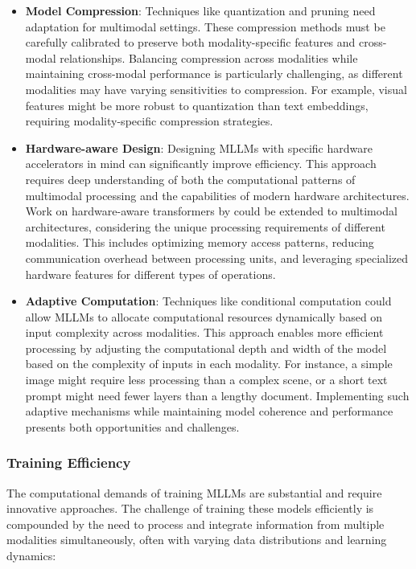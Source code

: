 \begin{itemize}
    \item \textbf{Model Compression}: Techniques like quantization and pruning \citep{ganesh2021compressing} need adaptation for multimodal settings. These compression methods must be carefully calibrated to preserve both modality-specific features and cross-modal relationships. Balancing compression across modalities while maintaining cross-modal performance is particularly challenging, as different modalities may have varying sensitivities to compression. For example, visual features might be more robust to quantization than text embeddings, requiring modality-specific compression strategies.
    
    \item \textbf{Hardware-aware Design}: Designing MLLMs with specific hardware accelerators in mind can significantly improve efficiency. This approach requires deep understanding of both the computational patterns of multimodal processing and the capabilities of modern hardware architectures. Work on hardware-aware transformers by could be extended to multimodal architectures, considering the unique processing requirements of different modalities. This includes optimizing memory access patterns, reducing communication overhead between processing units, and leveraging specialized hardware features for different types of operations.
    
    \item \textbf{Adaptive Computation}: Techniques like conditional computation \citep{bengio2013estimating} could allow MLLMs to allocate computational resources dynamically based on input complexity across modalities. This approach enables more efficient processing by adjusting the computational depth and width of the model based on the complexity of inputs in each modality. For instance, a simple image might require less processing than a complex scene, or a short text prompt might need fewer layers than a lengthy document. Implementing such adaptive mechanisms while maintaining model coherence and performance presents both opportunities and challenges.
\end{itemize}

\subsubsection{Training Efficiency}
The computational demands of training MLLMs are substantial and require innovative approaches. The challenge of training these models efficiently is compounded by the need to process and integrate information from multiple modalities simultaneously, often with varying data distributions and learning dynamics:

